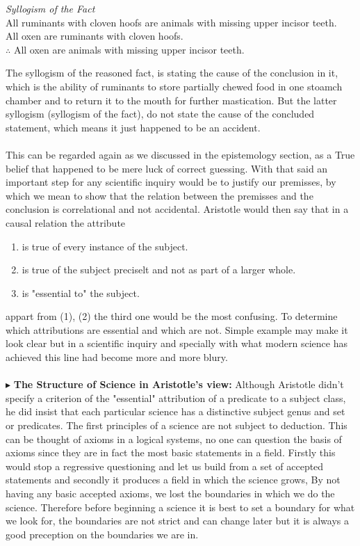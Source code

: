 \documentclass[9pt,a4paper,twocolumn]{article}
\newcommand{\newpoint}[1]{\indent$\blacktriangleright$ \textbf{#1}}
\begin{document}
            \begin{argue}
                \textit{Syllogism of the Fact}
                \\
                All ruminants with cloven hoofs are animals with missing upper incisor teeth.\\
                All oxen are ruminants with cloven hoofs.\\
                $\therefore$ All oxen are animals with missing upper incisor teeth.
            \end{argue}
            The syllogism of the reasoned fact, is stating the cause of the conclusion in it, which is the ability of ruminants to store partially chewed food in one stoamch chamber and to return it to the mouth for further mastication. But the latter syllogism (syllogism of the fact), do not state the cause of the concluded statement, which means it just happened to be an accident.
            \\
            \\
            This can be regarded again as we discussed in the epistemology section, as a True belief that happened to be mere luck of correct guessing. With that said an important step for any scientific inquiry would be to justify our premisses, by which we mean to show that the relation between the premisses and the conclusion is correlational and not accidental. Aristotle would then say that in a causal relation the attribute 
            \begin{enumerate}
                \item is true of every instance of the subject.
                \item is true of the subject preciselt and not as part of a larger whole.
                \item is "essential to" the subject.
            \end{enumerate}
            appart from (1), (2) the third one would be the most confusing. To determine which attributions are essential and which are not. Simple example may make it look clear but in a scientific inquiry and specially with what modern science has achieved this line had become more and more blury.\\
            \\
            \newpoint{The Structure of Science in Aristotle's view:} Although Aristotle didn't specify a criterion of the "essential" attribution of a predicate to a subject class, he did insist that each particular science has a distinctive subject genus and set or predicates. The first principles of a science are not subject to deduction. This can be thought of axioms in a logical systems, no one can question the basis of axioms since they are in fact the most basic statements in a field. Firstly this would stop a regressive questioning and let us build from a set of accepted statements and secondly it produces a field in which the science grows, By not having any basic accepted axioms, we lost the boundaries in which we do the science. Therefore before beginning a science it is best to set a boundary for what we look for, the boundaries are not strict and can change later but it is always a good preception on the boundaries we are in.
\end{document}
